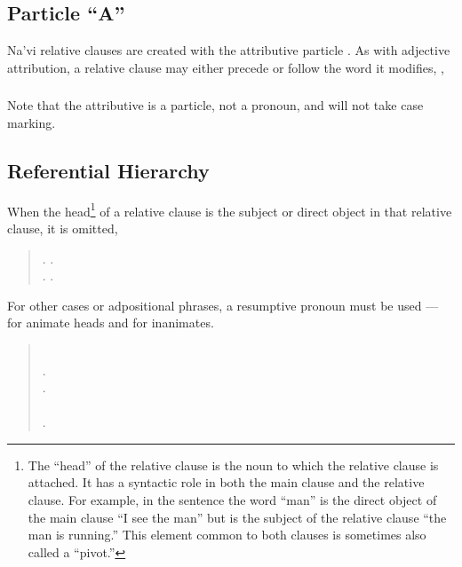 \subsection{Particle ``A''} Na'vi relative clauses are created with
the attributive particle .\label{syn:a} As
with adjective attribution, a relative clause may either precede or
follow the word it modifies,  ,
 

\subsubsection{} Note that the attributive  is a particle, not a
pronoun, and will not take case marking.

\subsection{Referential Hierarchy} When the head\footnote{The ``head''
of the relative clause is the noun to which the relative clause is
attached.  It has a syntactic role in both the main clause and the
relative clause.  For example, in the sentence  the word ``man'' is the direct object of the main clause ``I
see the man'' but is the subject of the relative clause ``the man is
running.''  This element common to both clauses is sometimes also
called a ``pivot.''} of a relative clause is the subject or direct
object in that relative clause, it is omitted,

\begin{quotation}
\noindent {}.
  .\\
\noindent {}.
  . 
\end{quotation}
\noindent For other cases or adpositional phrases, a resumptive
pronoun must be used ---  for animate heads and  for
inanimates.

\begin{quotation}
\noindent {} \\
\noindent {}.\\
\indent{}.\\
\noindent {} \\
\indent{}.
\end{quotation}

